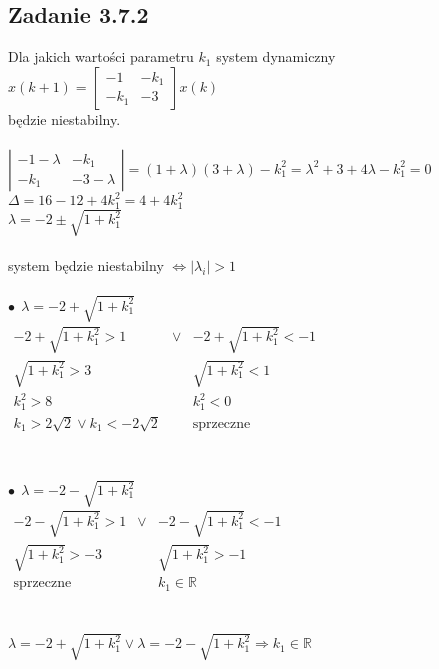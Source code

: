 \pagebreak
\subsection*{Zadanie 3.7.2} {\color{darkgray}
	Dla jakich wartości parametru $k_1$ system dynamiczny\\
	$x(k+1)=\left[ \begin{array}{cc}    -1 &-k_1 \\ -k_1 &-3    \end{array}\right]x(k)$\\
	będzie niestabilny.
}\\\\
$\left| \begin{array}{cc}    -1 -\lambda&-k_1 \\ -k_1 &-3-\lambda    \end{array}\right|=(1+\lambda)(3+\lambda)-k_1^2=\lambda^2+3+4\lambda-k_1^2=0$\\
$\Delta=16-12+4k_1^2=4+4k_1^2$\\
$\lambda=-2 \pm \sqrt{1+k_1^2}$\\
\\
system będzie niestabilny $\Leftrightarrow |\lambda_i|>1$\\
\\
$\bullet\ \ \lambda=-2 + \sqrt{1+k_1^2}$\\
$ \begin{array}{ccc}
-2 + \sqrt{1+k_1^2}>1                &\vee&    -2 + \sqrt{1+k_1^2}<-1  \\
\sqrt{1+k_1^2}>3                           & &         \sqrt{1+k_1^2}<1 \\
k_1^2>8                                           & &                  k_1^2<0\\
k_1>2\sqrt{2} \vee k_1<-2\sqrt{2} & &                     \text{sprzeczne}\\
\end{array} $\\
\\\\
$\bullet\ \ \lambda=-2 - \sqrt{1+k_1^2}$\\
$ \begin{array}{ccc}
-2 - \sqrt{1+k_1^2}>1                &\vee&    -2 - \sqrt{1+k_1^2}<-1  \\
\sqrt{1+k_1^2}>-3                           & &         \sqrt{1+k_1^2}>-1 \\
\text{sprzeczne}                                & &                  k_1 \in \mathbb{R}
\end{array} $\\
\\\\
$\lambda=-2 + \sqrt{1+k_1^2} \vee \lambda=-2 - \sqrt{1+k_1^2} \Rightarrow k_1 \in \mathbb{R}$

